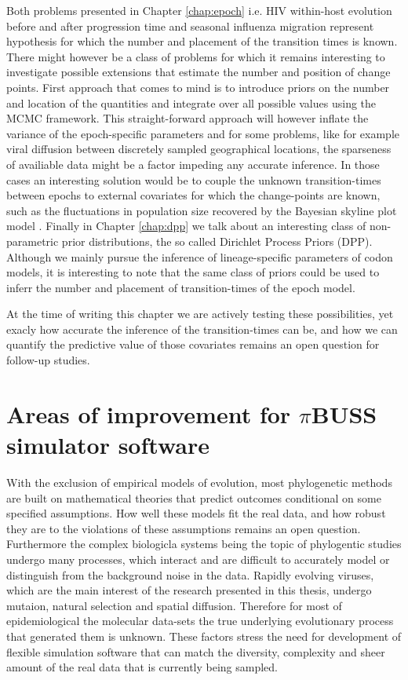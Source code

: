 Both problems presented in Chapter \ref{chap:epoch} i.e. HIV within-host evolution before and after progression time and seasonal influenza migration represent hypothesis for which the number and placement of the transition times is known.
There might however be a class of problems for which it remains interesting to investigate possible extensions that estimate the number and position of change points.
First approach that comes to mind is to introduce priors on the number and location of the quantities and integrate over all possible values using the MCMC framework.
This straight-forward approach will however inflate the variance of the epoch-specific parameters and for some problems, 
like for example viral diffusion between discretely sampled geographical locations, the sparseness of availiable data might be a factor impeding any accurate inference.
In those cases an interesting solution would be to couple the unknown transition-times between epochs to external covariates for which the change-points are known, such as  the fluctuations in population size recovered by the Bayesian skyline plot model \citep{Drummond2005}.
Finally in Chapter \ref{chap:dpp} we talk about an interesting class of non-parametric prior distributions, the so called Dirichlet Process Priors (DPP). 
Although we mainly pursue the inference of lineage-specific parameters of codon models, it is interesting to note that the same class of priors could be used to inferr the number and placement of transition-times of the epoch model.

At the time of writing this chapter we are actively testing these possibilities, yet exacly how accurate the inference of the transition-times can be, and how we can quantify the predictive value of those covariates remains an open question for follow-up studies.


\section{Areas of improvement for $\pi$BUSS simulator software}

With the exclusion of empirical models of evolution, most phylogenetic methods are built on mathematical theories that predict outcomes conditional on some specified assumptions.
How well these models fit the real data, and how robust they are to the violations of these assumptions remains an open question.
Furthermore the complex biologicla systems being the topic of phylogentic studies undergo many processes, which interact and are difficult to accurately model or distinguish from the background noise in the data.
Rapidly evolving viruses, which are the main interest of the research presented in this thesis, undergo mutaion, natural selection and spatial diffusion.
Therefore for most of epidemiological the molecular data-sets the true underlying evolutionary process that generated them is unknown.
These factors stress the need for development of flexible simulation software that can match the diversity, complexity and sheer amount of the real data that is currently being sampled.

